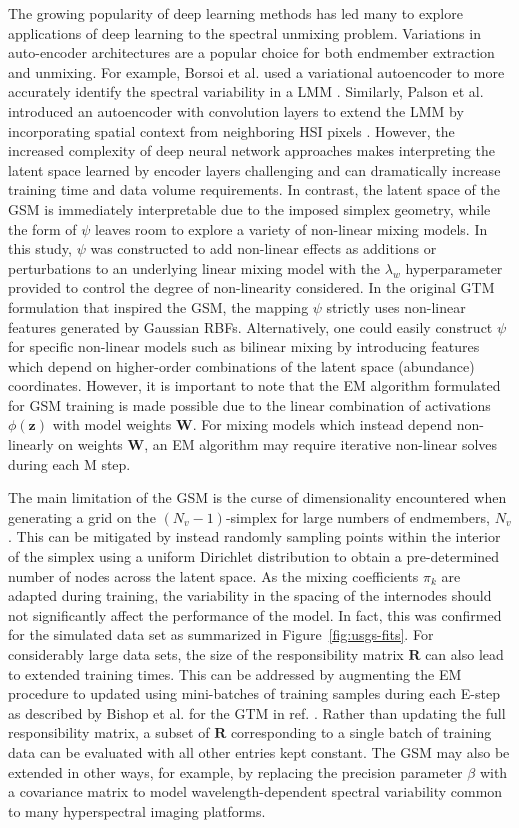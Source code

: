 The growing popularity of deep learning methods has led many to explore
applications of deep learning to the spectral unmixing problem. Variations in
auto-encoder architectures are a popular choice for both endmember extraction
and unmixing. For example, Borsoi et al. used a variational autoencoder to more
accurately identify the spectral variability in a LMM \cite{borsoi2019deep}.
Similarly, Palson et al. introduced an autoencoder with convolution layers to
extend the LMM by incorporating spatial context from neighboring HSI pixels
\cite{palsson2020convolutional}. However, the increased complexity of deep
neural network approaches makes interpreting the latent space learned by encoder
layers challenging and can dramatically increase training time and data volume
requirements. In contrast, the latent space of the GSM is immediately
interpretable due to the imposed simplex geometry, while the form of $\psi$
leaves room to explore a variety of non-linear mixing models. In this study,
$\psi$ was constructed to add non-linear effects as additions or perturbations
to an underlying linear mixing model with the $\lambda_w$ hyperparameter
provided to control the degree of non-linearity considered. In the original GTM
formulation that inspired the GSM, the mapping $\psi$ strictly uses non-linear
features generated by Gaussian RBFs. Alternatively, one could easily construct
$\psi$ for specific non-linear models such as bilinear mixing by introducing
features which depend on higher-order combinations of the latent space
(abundance) coordinates. However, it is important to note that the EM algorithm
formulated for GSM training is made possible due to the linear combination of
activations $\phi(\mathbf{z})$ with model weights $\mathbf{W}$. For mixing
models which instead depend non-linearly on weights $\mathbf{W}$, an EM
algorithm may require iterative non-linear solves during each M step.


The main limitation of the GSM is the curse of dimensionality encountered when
generating a grid on the $(N_v-1)$-simplex for large numbers of endmembers,
$N_v$. This can be mitigated by instead randomly sampling points within the
interior of the simplex using a uniform Dirichlet distribution to obtain a
pre-determined number of nodes across the latent space. As the mixing
coefficients $\pi_k$ are adapted during training, the variability in the spacing
of the internodes should not significantly affect the performance of the model.
In fact, this was confirmed for the simulated data set as summarized in
Figure~\ref{fig:usgs-fits}. For considerably large data sets, the size of the
responsibility matrix $\mathbf{R}$ can also lead to extended training times.
This can be addressed by augmenting the EM procedure to updated using
mini-batches of training samples during each E-step as described by Bishop et
al. for the GTM in ref. \cite{gtm-developments}. Rather than updating the full
responsibility matrix, a subset of $\mathbf{R}$ corresponding to a single batch
of training data can be evaluated with all other entries kept constant. The GSM
may also be extended in other ways, for example, by replacing the precision
parameter $\beta$ with a covariance matrix to model wavelength-dependent
spectral variability common to many hyperspectral imaging platforms.


